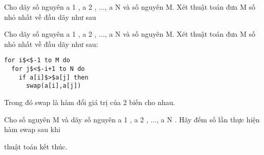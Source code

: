 Cho dãy số nguyên a 1 , a 2 , ..., a N và số nguyên M. Xét thuật toán đưa M số nhỏ nhất về đầu dãy như sau

Cho dãy số nguyên a 1 , a 2 , ..., a N và số nguyên M. Xét thuật toán đưa M số nhỏ nhất về đầu dãy như sau:
\begin{verbatim}
for i$<$-1 to M do
  for j$<$-i+1 to N do
    if a[i]$>$a[j] then
      swap(a[i],a[j])\end{verbatim}

Trong đó swap là hàm đổi giá trị của 2 biến cho nhau.

Cho số nguyên M và dãy số nguyên a 1 , a 2 , ..., a N . Hãy đếm số lần thực hiện hàm swap sau khi

thuật toán kết thúc.

 